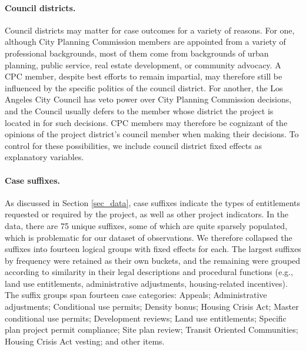 \paragraph{Council districts.} Council districts may matter for case outcomes for a variety of reasons. For one, although City Planning Commission members are appointed from a variety of professional backgrounds, most of them come from backgrounds of urban planning, public service, real estate development, or community advocacy. A CPC member, despite best efforts to remain impartial, may therefore still be influenced by the specific politics of the council district. For another, the Los Angeles City Council has veto power over City Planning Commission decisions, and the Council usually defers to the member whose district the project is located in for such decisions. CPC members may therefore be cognizant of the opinions of the project district's council member when making their decisions. To control for these possibilities, we include council district fixed effects as explanatory variables.

\paragraph{Case suffixes.} As discussed in Section \ref{sec_data}, case suffixes indicate the types of entitlements requested or required by the project, as well as other project indicators. In the data, there are 75 unique suffixes, some of which are quite sparsely populated, which is problematic for our dataset of  observations. We therefore collapsed the suffixes into fourteen logical groups with fixed effects for each. The largest suffixes by frequency were retained as their own buckets, and the remaining were grouped according to similarity in their legal descriptions and procedural functions (e.g., land use entitlements, administrative adjustments, housing-related incentives). The suffix groups span fourteen case categories: Appeals; Administrative adjustments; Conditional use permits; Density bonus; Housing Crisis Act; Master conditional use permits; Development reviews; Land use entitlements; Specific plan project permit compliance; Site plan review; Transit Oriented Communities; Housing Crisis Act vesting; and other items.









